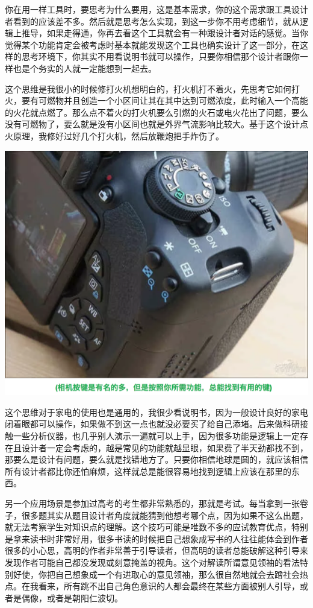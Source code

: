 \documentclass[]{book}
\begin{document}
你在用一样工具时，要思考为什么要用，这是基本需求，你的这个需求跟工具设计者看到的应该差不多。然后就是思考怎么实现，到这一步你不用考虑细节，就从逻辑上推导，如果走得通，你再去看这个工具就会有一种跟设计者对话的感觉。当你觉得某个功能肯定会被考虑时基本就能发现这个工具也确实设计了这一部分，在这样的思考环境下，你其实不用看说明书就可以操作，只要你相信那个设计者跟你一样也是个务实的人就一定能想到一起去。

这个思维是我很小的时候修打火机想明白的，打火机打不着火，先思考它如何打火，要有可燃物并且创造一个小区间让其在其中达到可燃浓度，此时输入一个高能的火花就点燃了。那么点不着火的打火机要么引燃的火石或电火花出了问题，要么没有可燃物了，要么就是没有小区间也就是外界气流影响比较大。基于这个设计点火原理，我修好过好几个打火机，然后放鞭炮把手炸伤了。

\includegraphics[width=8.33in]{images/sheji3}

这个思维对于家电的使用也是通用的，我很少看说明书，因为一般设计良好的家电闭着眼都可以操作，如果做不到这一点也就没必要买了给自己添堵。后来做科研接触一些分析仪器，也几乎别人演示一遍就可以上手，因为很多功能是逻辑上一定存在且设计者一定会考虑的，越是常见的功能就越显眼，如果费了半天劲都找不到，那要么是设计有问题，要么就是找错地方了。只要你相信地球是圆的，就应该相信所有设计者都比你还怕麻烦，这样就总是能很容易地找到逻辑上应该在那里的东西。

另一个应用场景是参加过高考的考生都非常熟悉的，那就是考试。每当拿到一张卷子，很多题其实从题目设计者角度就能猜到他想考哪个点，因为如果不这么出题，就无法考察学生对知识点的理解。这个技巧可能是唯数不多的应试教育优点，特别是拿来读书时非常好用，很多书读的时候把自己想象成写书的人往往能体会到作者很多的小心思，高明的作者非常善于引导读者，但高明的读者总能破解这种引导来发现作者可能自己都没发现或刻意掩盖的视角。这个对解读所谓意见领袖的看法特别好使，你把自己想象成一个有进取心的意见领袖，那么很自然地就会去蹭社会热点。在我看来，所有跳不出自己角色意识的人都会最终在某些方面被别人引导，或者是偶像，或者是朝阳仁波切。
\end{document}
